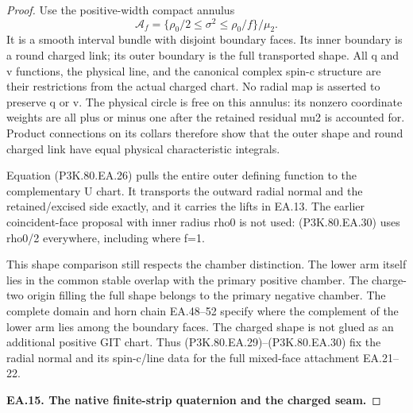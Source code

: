 \begin{proof}
Use the positive-width compact annulus
\[
 \mathcal A_f=\{\rho_0/2\le\sigma^2\le\rho_0/f\}/\mu_2.
 \tag{P3K.80.EA.30}
\]
It is a smooth interval bundle with disjoint boundary faces. Its
inner boundary is a round charged link; its outer boundary is the
full transported shape. All q and v functions, the physical line,
and the canonical complex spin-c structure are their restrictions
from the actual charged chart. No radial map is asserted to
preserve q or v. The physical circle is free on this annulus:
its nonzero coordinate weights are all plus or minus one after
the retained residual mu2 is accounted for. Product connections
on its collars therefore show that the outer shape and round
charged link have equal physical characteristic integrals.

Equation (P3K.80.EA.26) pulls the entire outer defining function to the
complementary U chart. It transports the outward radial normal
and the retained/excised side exactly, and it carries the lifts
in EA.13. The earlier coincident-face proposal with inner radius
rho0 is not used: (P3K.80.EA.30) uses rho0/2 everywhere, including where
f=1.

This shape comparison still respects the chamber distinction.
The lower arm itself lies in the common stable overlap with the
primary positive chamber. The charge-two origin filling the full
shape belongs to the primary negative chamber. The complete domain and horn chain EA.48--52 specify where the complement of the lower arm lies among the boundary faces. The charged shape is not
glued as an additional positive GIT chart. Thus (P3K.80.EA.29)--(P3K.80.EA.30)
fix the radial normal and its spin-c/line data for the full mixed-face attachment EA.21--22.

\par\medskip\noindent\textbf{EA.15. The native finite-strip quaternion and the charged seam.}\par\nopagebreak[4]


\end{proof}
